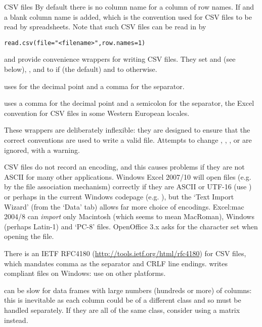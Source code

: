 %
\begin{Section}{CSV files}
By default there is no column name for a column of row names.  If
 and  a blank column name
is added, which is the convention used for CSV files to be read by
spreadsheets.  Note that such CSV files can be read in \R{} by
\begin{alltt}  read.csv(file = "<filename>", row.names = 1)\end{alltt}


 and  provide convenience wrappers
for writing CSV files.  They set  and  (see
below), , and  to 
if  (the default) and to  otherwise.

 uses  for the decimal point and a comma for
the separator.

 uses a comma for the decimal point and a semicolon for
the separator, the Excel convention for CSV files in some Western
European locales.

These wrappers are deliberately inflexible: they are designed to
ensure that the correct conventions are used to write a valid file.
Attempts to change , , ,
 or  are ignored, with a warning.

CSV files do not record an encoding, and this causes problems if they
are not ASCII for many other applications.  Windows Excel 2007/10 will
open files (e.g. by the file association mechanism) correctly if they
are ASCII or UTF-16 (use ) or perhaps in
the current Windows codepage (e.g. ), but the
`Text Import Wizard' (from the `Data' tab) allows far
more choice of encodings.  Excel:mac 2004/8 can \emph{import} only
Macintosh (which seems to mean MacRoman), Windows (perhaps Latin-1)
and `PC-8' files.  OpenOffice 3.x asks for the character set
when opening the file.

There is an IETF RFC4180 (\url{http://tools.ietf.org/html/rfc4180})
for CSV files, which mandates comma as the separator and CRLF line
endings.   writes compliant files on Windows: use
 on other platforms.
\end{Section}
%
\begin{Note}\relax
{} can be slow for data frames with large numbers
(hundreds or more) of columns: this is inevitable as each column could
be of a different class and so must be handled separately.  If they
are all of the same class, consider using a matrix instead.
\end{Note}

